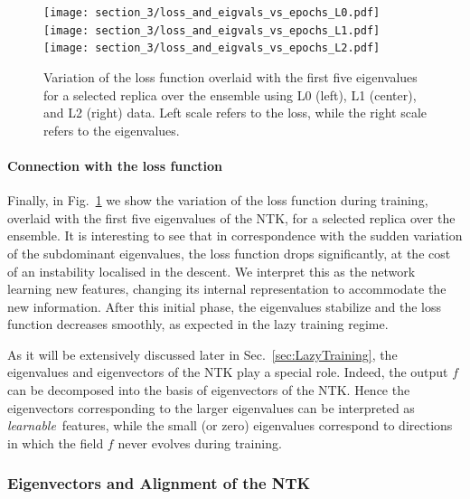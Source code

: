 \begin{figure}[t]
  \centering
  \texttt{[image: section\_3/loss\_and\_eigvals\_vs\_epochs\_L0.pdf]}
  \texttt{[image: section\_3/loss\_and\_eigvals\_vs\_epochs\_L1.pdf]}
  \texttt{[image: section\_3/loss\_and\_eigvals\_vs\_epochs\_L2.pdf]}
  \caption{Variation of the loss function overlaid with the first five
  eigenvalues for a selected replica over the ensemble using L0 (left), L1
  (center), and L2 (right) data. Left scale refers to the loss, while the right
  scale refers to the eigenvalues.}
  \label{fig:Loss}
\end{figure}

\paragraph{Connection with the loss function} Finally, in Fig.~\ref{fig:Loss} we
show the variation of the loss function during training, overlaid with the first
five eigenvalues of the NTK, for a selected replica over the ensemble. It is
interesting to see that in correspondence with the sudden variation of the
subdominant eigenvalues, the loss function drops significantly, at the cost of
an instability localised in the descent. We interpret this as the network
learning new features, changing its internal representation to accommodate the
new information. After this initial phase, the eigenvalues stabilize and the
loss function decreases smoothly, as expected in the lazy training regime.

As it will be extensively discussed later in Sec.~\ref{sec:LazyTraining}, the
eigenvalues and eigenvectors of the NTK play a special role. Indeed, the output
$f$ can be decomposed into the basis of eigenvectors of the NTK. Hence the
eigenvectors corresponding to the larger eigenvalues can be interpreted as {\em
learnable}\ features, while the small (or zero) eigenvalues correspond to
directions in which the field $f$ never evolves during training.


\subsubsection{Eigenvectors and Alignment of the NTK}
\label{sec:NTKAlign}

